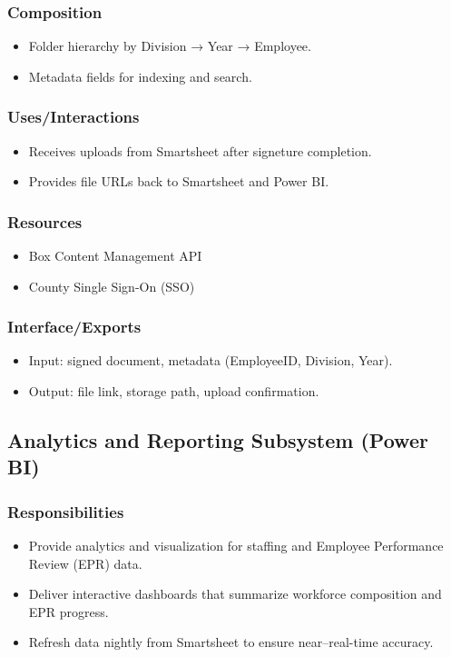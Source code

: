 \documentclass[12pt]{article}
\begin{document}
\subsubsection{Composition}
\begin{itemize}[nosep]
  \item Folder hierarchy by Division → Year → Employee.
  \item Metadata fields for indexing and search.
\end{itemize}

\subsubsection{Uses/Interactions}
\begin{itemize}[nosep]
  \item Receives uploads from Smartsheet after signeture completion.
  \item Provides file URLs back to Smartsheet and Power BI.
\end{itemize}

\subsubsection{Resources}
\begin{itemize}[nosep]
  \item Box Content Management API
  \item County Single Sign-On (SSO)
\end{itemize}

\subsubsection{Interface/Exports}
\begin{itemize}[nosep]
  \item Input: signed document, metadata (EmployeeID, Division, Year).
  \item Output: file link, storage path, upload confirmation.
\end{itemize}

\subsection{Analytics and Reporting Subsystem (Power BI)}
\subsubsection{Responsibilities}
\begin{itemize}[nosep]
  \item Provide analytics and visualization for staffing and Employee Performance Review (EPR) data.
  \item Deliver interactive dashboards that summarize workforce composition and EPR progress.
  \item Refresh data nightly from Smartsheet to ensure near–real-time accuracy.
\end{itemize}
\end{document}
